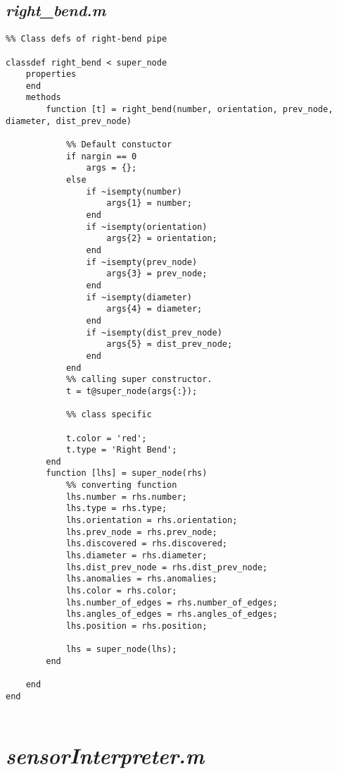 \subsection{\emph{right\_bend.m}}

\begin{lstlisting}
%% Class defs of right-bend pipe
 
classdef right_bend < super_node
    properties
    end
    methods
        function [t] = right_bend(number, orientation, prev_node, diameter, dist_prev_node)
            
            %% Default constuctor
            if nargin == 0
                args = {};
            else
                if ~isempty(number)
                    args{1} = number;
                end
                if ~isempty(orientation)
                    args{2} = orientation;
                end
                if ~isempty(prev_node)
                    args{3} = prev_node;
                end
                if ~isempty(diameter)
                    args{4} = diameter;
                end
                if ~isempty(dist_prev_node)
                    args{5} = dist_prev_node;
                end
            end    
            %% calling super constructor.
            t = t@super_node(args{:});
            
            %% class specific
            
            t.color = 'red';
            t.type = 'Right Bend';
        end
        function [lhs] = super_node(rhs)
            %% converting function
            lhs.number = rhs.number;
            lhs.type = rhs.type;
            lhs.orientation = rhs.orientation;
            lhs.prev_node = rhs.prev_node;
            lhs.discovered = rhs.discovered;
            lhs.diameter = rhs.diameter;
            lhs.dist_prev_node = rhs.dist_prev_node;
            lhs.anomalies = rhs.anomalies;
            lhs.color = rhs.color;
            lhs.number_of_edges = rhs.number_of_edges;
            lhs.angles_of_edges = rhs.angles_of_edges;
            lhs.position = rhs.position;
            
            lhs = super_node(lhs);            
        end
        
    end
end
 

\end{lstlisting}


\section{\emph{sensorInterpreter.m}}
\label{app:sensorinterpreter}

